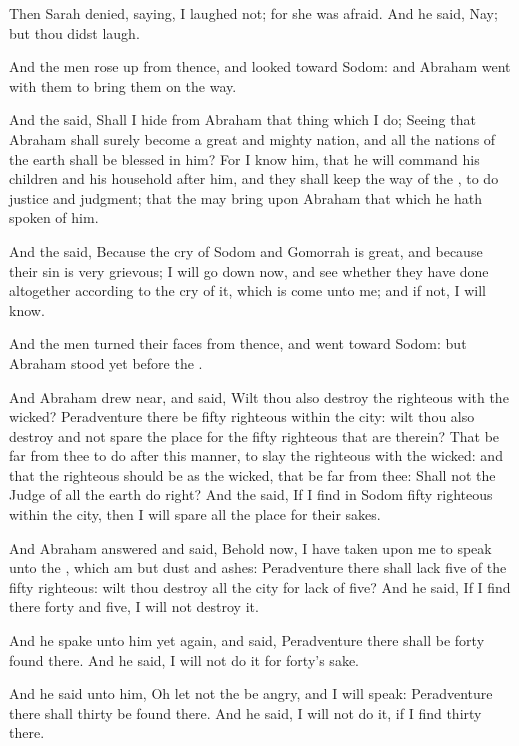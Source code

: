 \verse Then Sarah denied, saying, I laughed not; for she was afraid.
And he said, Nay; but thou didst laugh.

\verse And the men rose up from thence, and looked toward Sodom: and
Abraham went with them to bring them on the way.

\verse And the \LORD said, Shall I hide from Abraham that thing which I
do; \verse Seeing that Abraham shall surely become a great and mighty
nation, and all the nations of the earth shall be blessed in him?
\verse For I know him, that he will command his children and his
household after him, and they shall keep the way of the \LORD, to do
justice and judgment; that the \LORD may bring upon Abraham that which
he hath spoken of him.

\verse And the \LORD said, Because the cry of Sodom and Gomorrah is
great, and because their sin is very grievous; \verse I will go down
now, and see whether they have done altogether according to the cry of
it, which is come unto me; and if not, I will know.

\verse And the men turned their faces from thence, and went toward
Sodom: but Abraham stood yet before the \LORD.

\verse And Abraham drew near, and said, Wilt thou also destroy the
righteous with the wicked?  \verse Peradventure there be fifty
righteous within the city: wilt thou also destroy and not spare the
place for the fifty righteous that are therein?  \verse That be far
from thee to do after this manner, to slay the righteous with the
wicked: and that the righteous should be as the wicked, that be far
from thee: Shall not the Judge of all the earth do right?  \verse And
the \LORD said, If I find in Sodom fifty righteous within the city,
then I will spare all the place for their sakes.

\verse And Abraham answered and said, Behold now, I have taken upon me
to speak unto the \LORD, which am but dust and ashes: \verse
Peradventure there shall lack five of the fifty righteous: wilt thou
destroy all the city for lack of five? And he said, If I find there
forty and five, I will not destroy it.

\verse And he spake unto him yet again, and said, Peradventure there
shall be forty found there. And he said, I will not do it for forty's
sake.

\verse And he said unto him, Oh let not the \LORD be angry, and I will
speak: Peradventure there shall thirty be found there. And he said, I
will not do it, if I find thirty there.

